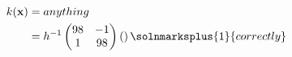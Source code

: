\begin{align*}k(\mathbf{x})&=anything \\
&=h^{-1}\begin{pmatrix}
98&-1\\
1& 98
\end{pmatrix}\left(\right)\solnmarksplus{1}{correctly}\\
\end{align*}
